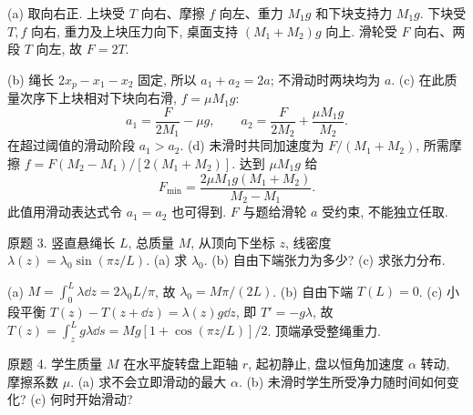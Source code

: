 \begin{solution}
(a) 取向右正. 上块受 $T$ 向右、摩擦 $f$ 向左、重力 $M_1g$ 和下块支持力 $M_1g$. 下块受 $T,f$ 向右, 重力及上块压力向下, 桌面支持 $(M_1+M_2)g$ 向上. 滑轮受 $F$ 向右、两段 $T$ 向左, 故 $F=2T$. \begin{center}\end{center}
(b) 绳长 $2x_p-x_1-x_2$ 固定, 所以 $a_1+a_2=2a$; 不滑动时两块均为 $a$. (c) 在此质量次序下上块相对下块向右滑, $f=\mu M_1g$:
\[
a_1=\frac F{2M_1}-\mu g,\qquad a_2=\frac F{2M_2}+\frac{\mu M_1g}{M_2}.
\]
在超过阈值的滑动阶段 $a_1>a_2$. (d) 未滑时共同加速度为 $F/(M_1+M_2)$, 所需摩擦 $f=F(M_2-M_1)/[2(M_1+M_2)]$. 达到 $\mu M_1g$ 给
\[F_{\min}=\frac{2\mu M_1g(M_1+M_2)}{M_2-M_1}.\]
此值用滑动表达式令 $a_1=a_2$ 也可得到. $F$ 与题给滑轮 $a$ 受约束, 不能独立任取.
\end{solution}
\begin{exercise}
原题 3. 竖直悬绳长 $L$, 总质量 $M$, 从顶向下坐标 $z$, 线密度 $\lambda(z)=\lambda_0\sin(\pi z/L)$. (a) 求 $\lambda_0$. (b) 自由下端张力为多少? (c) 求张力分布.
\end{exercise}
\begin{solution}
(a) $M=\int_0^L\lambda\dd z=2\lambda_0L/\pi$, 故 $\lambda_0=M\pi/(2L)$. (b) 自由下端 $T(L)=0$. (c) 小段平衡 $T(z)-T(z+\dd z)=\lambda(z)g\dd z$, 即 $T'=-g\lambda$, 故 $T(z)=\int_z^Lg\lambda\dd s=Mg[1+\cos(\pi z/L)]/2$. 顶端承受整绳重力.
\end{solution}
\begin{exercise}
原题 4. 学生质量 $M$ 在水平旋转盘上距轴 $r$, 起初静止, 盘以恒角加速度 $\alpha$ 转动, 摩擦系数 $\mu$. (a) 求不会立即滑动的最大 $\alpha$. (b) 未滑时学生所受净力随时间如何变化? (c) 何时开始滑动?
\end{exercise}
